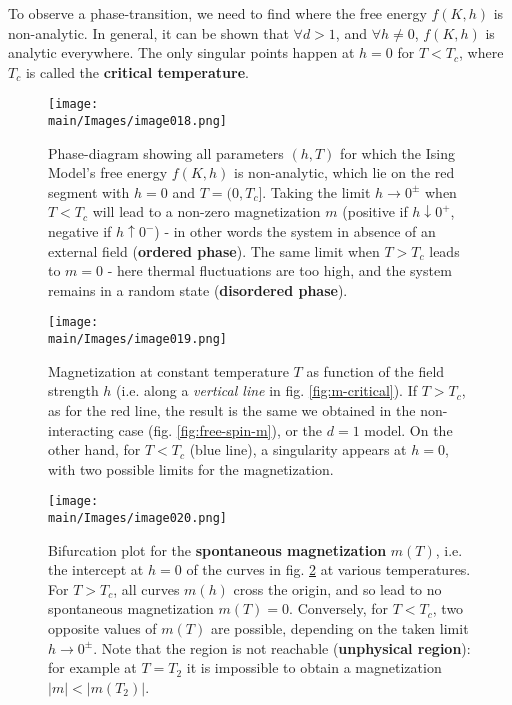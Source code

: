 \documentclass[../../main.tex]{subfiles}
\begin{document}
To observe a phase-transition, we need to find where the free energy $f(K,h)$ is non-analytic. In general, it can be shown that $\forall d > 1$, and $\forall h \neq 0$, $f(K,h)$ is analytic everywhere. The only singular points happen at $h=0$ for $T < T_c$, where $T_c$ is called the \textbf{critical temperature}. 

\begin{figure}[H]
    \centering
    \texttt{[image: \\main/Images/image018.png]} 
    \caption{Phase-diagram showing all parameters $(h,T)$ for which the Ising Model's free energy $f(K,h)$ is non-analytic, which lie on the red segment with $h=0$ and $T=(0,T_c]$. Taking the limit $h \to 0^\pm$ when $T < T_c$ will lead to a non-zero magnetization $m$ (positive if $h \downarrow 0^+$, negative if $h \uparrow 0^-$) - in other words the system  in absence of an external field (\textbf{ordered phase}). The same limit when $T > T_c$ leads to $m = 0$ - here thermal fluctuations are too high, and the system remains in a random state (\textbf{disordered phase}).\label{fig:non-analytic}}
\end{figure}

\begin{figure}[H]
    \centering
    \texttt{[image: \\main/Images/image019.png]}
    \caption{Magnetization at constant temperature $T$ as function of the field strength $h$ (i.e. along a \textit{vertical line} in fig. \ref{fig:m-critical}). If $T > T_c$, as for the red line, the result is the same we obtained in the non-interacting case (fig. \ref{fig:free-spin-m}), or the $d=1$ model. On the other hand, for $T < T_c$ (blue line), a singularity appears at $h=0$, with two possible limits for the magnetization.\label{fig:m-plot}}
\end{figure}

\begin{figure}[H]
    \centering
    \texttt{[image: \\main/Images/image020.png]}
    \caption{Bifurcation plot for the \textbf{spontaneous magnetization} $m(T)$, i.e. the intercept at $h=0$ of the curves in fig. \ref{fig:m-plot} at various temperatures. For $T > T_c$, all curves $m(h)$ cross the origin, and so lead to no spontaneous magnetization $m(T) = 0$. Conversely, for $T < T_c$, two opposite values of $m(T)$ are possible, depending on the taken limit $h \to 0^\pm$. Note that the region  is not reachable (\textbf{unphysical region}): for example at $T = T_2$ it is impossible to obtain a magnetization $|m| < |m(T_2)|$. \label{fig:spont-m}}
\end{figure}
\end{document}
